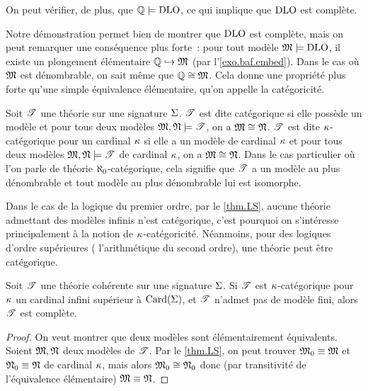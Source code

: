 \begin{example}
  On peut vérifier, de plus, que $\mathbb Q\models\operatorname{DLO}$, ce qui implique que
  $\operatorname{DLO}$ est complète.
\end{example}

Notre démonstration permet bien de montrer que $\operatorname{DLO}$ est complète, mais on peut
remarquer une conséquence plus forte~: pour tout modèle $\mathfrak{M}\models\operatorname{DLO}$,
il existe un plongement élémentaire $\mathbb Q\hookrightarrow\mathfrak{M}$ (par
l'\cref{exo.baf.embed}).
Dans le cas où $\mathfrak{M}$ est dénombrable, on sait même que $\mathbb Q\cong\mathfrak{M}$. Cela
donne une propriété plus forte qu'une simple équivalence élémentaire, qu'on
appelle la catégoricité.

\begin{definition}[Catégoricité]
  Soit $\mathscr T$ une théorie sur une signature $\Sigma$. $\mathscr T$ est dite
  catégorique si elle possède un modèle et pour tous deux modèles
  $\mathfrak{M},\mathfrak{N}\models\mathscr T$, on a $\mathfrak{M}\cong\mathfrak{N}$. $\mathscr T$ est dite
  $\kappa$-catégorique pour un cardinal $\kappa$ si elle a un modèle de cardinal
  $\kappa$ et pour tous deux modèles $\mathfrak{M},\mathfrak{N}\models\mathscr T$ de cardinal
  $\kappa$, on a $\mathfrak{M}\cong\mathfrak{N}$. Dans le cas particulier où l'on parle
  de théorie $\aleph_0$-catégorique, cela signifie que $\mathscr T$ a un modèle
  au plus dénombrable et tout modèle au plus dénombrable lui est isomorphe.
\end{definition}

\begin{remark}
  Dans le cas de la logique du premier ordre, par le \cref{thm.LS}, aucune
  théorie admettant des modèles infinis n'est catégorique, c'est pourquoi on
  s'intéresse principalement à la notion de $\kappa$-catégoricité. Néanmoins,
  pour des logiques d'ordre supérieures ( l'arithmétique du
  second ordre), une théorie peut être catégorique.
\end{remark}

\begin{proposition}
  Soit $\mathscr T$ une théorie cohérente sur une signature $\Sigma$. Si $\mathscr T$ est
  $\kappa$-catégorique pour $\kappa$ un cardinal infini supérieur à
  $\operatorname{Card}(\Sigma)$, et $\mathscr T$ n'admet pas de modèle fini, alors
  $\mathscr T$ est complète.
\end{proposition}

\begin{proof}
  On veut montrer que deux modèles sont élémentairement équivalents. Soient
  $\mathfrak{M},\mathfrak{N}$ deux modèles de $\mathscr T$. Par le \cref{thm.LS}, on peut
  trouver $\mathfrak{M}_0\equiv\mathfrak{M}$ et $\mathfrak{N}_0\equiv\mathfrak{N}$ de cardinal
  $\kappa$, mais alors $\mathfrak{M}_0\cong\mathfrak{N}_0$ donc (par transitivité de
  l'équivalence élémentaire) $\mathfrak{M}\equiv\mathfrak{N}$.
\end{proof}

